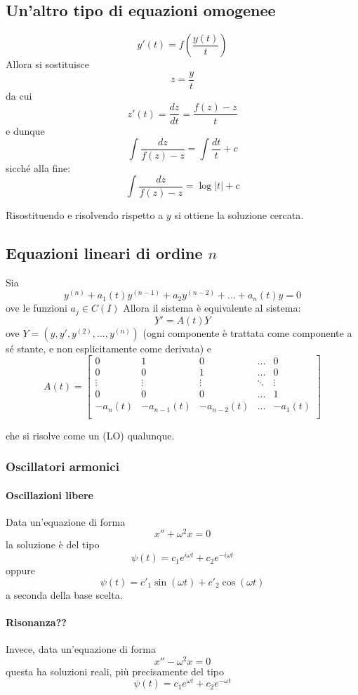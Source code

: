 \documentclass[a4paper,12pt]{article}
\begin{document}
\subsection{Un'altro tipo di equazioni omogenee}
$$y'(t) = f\left(\dfrac{y(t)}{t}\right)$$
Allora si sostituisce
$$z=\dfrac{y}{t}$$
da cui $$z'(t) = \dfrac{dz}{dt} = \dfrac{f(z)-z}{t}$$
e dunque
$$\int\dfrac{dz}{f(z)-z}=\int \dfrac{dt}{t} + c$$
sicché alla fine:
$$\int\dfrac{dz}{f(z)-z} = \log|t| + c$$

Risostituendo e risolvendo rispetto a $y$ si ottiene la soluzione cercata.

\subsection{Equazioni lineari di ordine $n$}
Sia
$$y^{(n)} + a_1(t)y^{(n-1)} + a_2y^{(n-2)} + ... + a_n(t)y = 0$$
ove le funzioni $a_j \in C(I)$
Allora il sistema è equivalente al sistema:
$$\underbar{Y}' = A(t)\underbar{Y}$$
ove $\underbar{Y}=(y, y', y^{(2)}, ..., y^{(n)})$ (ogni componente è trattata come componente a sé stante, e non esplicitamente come derivata) e
$$A(t) =
\begin{bmatrix}
0 & 1 & 0 & ... & 0\\
0 & 0 & 1 & ... & 0\\
\vdots & \vdots & \vdots & \ddots & \vdots \\
0 & 0 & 0 & ... & 1 \\
-a_n(t) & -a_{n-1}(t) & -a_{n-2}(t) & ... & -a_{1}(t) \\
\end{bmatrix}
$$

che si risolve come un (LO) qualunque.

\subsubsection{Oscillatori armonici}
\paragraph{Oscillazioni libere}
Data un'equazione di forma
$$x''+\omega^2 x=0$$
la soluzione è del tipo
$$\psi(t) = c_1 e^{i\omega t} + c_2 e^{-i\omega t}$$
oppure
$$\psi(t) = c'_1\sin(\omega t) + c'_2\cos(\omega t)$$
a seconda della base scelta.

\paragraph{Risonanza??}
Invece, data un'equazione di forma
$$x''-\omega^2 x=0$$
questa ha soluzioni reali, più precisamente del tipo
$$\psi(t) = c_1 e^{\omega t} + c_2 e^{-\omega t}$$
\end{document}
